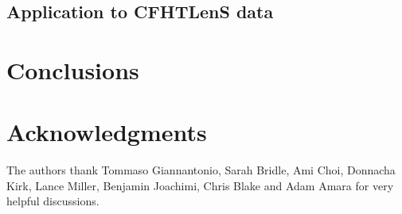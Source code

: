 \documentclass[fleqn,usenatbib]{mnras} %
\begin{document}
\subsection{Application to CFHTLenS data}
\label{sec:cfhtlens}






\section{Conclusions}

\section*{Acknowledgments}

The authors thank Tommaso Giannantonio, Sarah Bridle, Ami Choi, Donnacha Kirk, Lance Miller, Benjamin Joachimi, Chris Blake and Adam Amara for very helpful discussions.



\end{document}
